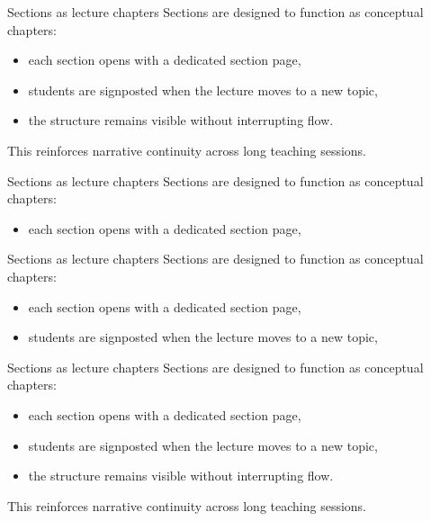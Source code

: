 \documentclass[aspectratio=169]{beamer}
\begin{document}
\begin{frame}{Sections as lecture chapters}
Sections are designed to function as conceptual chapters:
\begin{itemize}
  \item each section opens with a dedicated section page,
  \item students are signposted when the lecture moves to a new topic,
  \item the structure remains visible without interrupting flow.
\end{itemize}

\vspace{0.6em}
This reinforces narrative continuity across long teaching sessions.
\end{frame}

\begin{frame}{Sections as lecture chapters}
Sections are designed to function as conceptual chapters:
\begin{itemize}
  \item each section opens with a dedicated section page,
\end{itemize}
\end{frame}

\begin{frame}{Sections as lecture chapters}
Sections are designed to function as conceptual chapters:
\begin{itemize}
  \item each section opens with a dedicated section page,
  \item students are signposted when the lecture moves to a new topic,
\end{itemize}
\end{frame}

\begin{frame}{Sections as lecture chapters}
Sections are designed to function as conceptual chapters:
\begin{itemize}
  \item each section opens with a dedicated section page,
  \item students are signposted when the lecture moves to a new topic,
  \item the structure remains visible without interrupting flow.
\end{itemize}

\vspace{0.6em}
This reinforces narrative continuity across long teaching sessions.
\end{frame}
\end{document}
